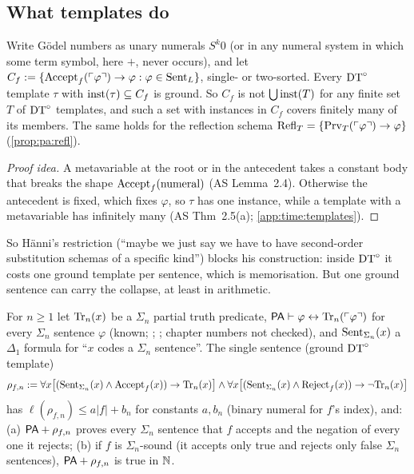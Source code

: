 \subsection{What templates do}\label{sec:time:templates}

\begin{proposition}\label{prop:time:notemplate}
Write Gödel numbers as unary numerals $S^k0$ (or in any numeral system in which some term symbol, here $+$, never occurs), and let $C_f:=\{\mathrm{Accept}_{f}(\ulcorner \varphi\urcorner)\to\varphi:\varphi\in\mathrm{Sent}_L\}$, single- or two-sorted. Every $\mathrm{DT}^{\circ}$ template $\tau$ with $\mathrm{inst}(\tau)\subseteq C_f$ is ground. So $C_f$ is not $\bigcup\mathrm{inst}(T)$ for any finite set $T$ of $\mathrm{DT}^{\circ}$ templates, and such a set with instances in $C_f$ covers finitely many of its members. The same holds for the reflection schema $\mathrm{Refl}_T=\{\mathrm{Prv}_T(\ulcorner \varphi\urcorner)\to\varphi\}$ (\cref{prop:pa:refl}).
\end{proposition}

\begin{proof}[Proof idea]
A metavariable at the root or in the antecedent takes a constant body that breaks the shape $\mathrm{Accept}_{f}(\text{numeral})$ (AS Lemma~2.4). Otherwise the antecedent is fixed, which fixes $\varphi$, so $\tau$ has one instance, while a template with a metavariable has infinitely many (AS Thm~2.5(a); \cref{app:time:templates}).
\end{proof}

So H\"anni's restriction (``maybe we just say we have to have second-order substitution schemas of a specific kind'') blocks his construction: inside $\mathrm{DT}^{\circ}$ it costs one ground template per sentence, which is memorisation. But one ground sentence can carry the collapse, at least in arithmetic.

\begin{proposition}\label{prop:time:collapse}
For $n\ge1$ let $\mathrm{Tr}_n(x)$ be a $\Sigma_n$ partial truth predicate, $\mathsf{PA}\vdash\varphi\leftrightarrow\mathrm{Tr}_n(\ulcorner \varphi\urcorner)$ for every $\Sigma_n$ sentence $\varphi$ (known; \citealp[Ch.~I]{hajek1993metamathematics}; \citealp[Ch.~9]{kaye1991models}; chapter numbers not checked), and $\mathrm{Sent}_{\Sigma_n}(x)$ a $\Delta_1$ formula for ``$x$ codes a $\Sigma_n$ sentence''. The single sentence (ground $\mathrm{DT}^{\circ}$ template)
\[
\rho_{f,n}:=\forall x\big[(\mathrm{Sent}_{\Sigma_n}(x)\wedge\mathrm{Accept}_{f}(x))\to\mathrm{Tr}_n(x)\big]\wedge\forall x\big[(\mathrm{Sent}_{\Sigma_n}(x)\wedge\mathrm{Reject}_{f}(x))\to\neg\mathrm{Tr}_n(x)\big]
\]
has $\ell(\rho_{f,n})\le a|f|+b_n$ for constants $a,b_n$ (binary numeral for $f$'s index), and:
(a) $\mathsf{PA}+\rho_{f,n}$ proves every $\Sigma_n$ sentence that $f$ accepts and the negation of every one it rejects;
(b) if $f$ is $\Sigma_n$-sound (it accepts only true and rejects only false $\Sigma_n$ sentences), $\mathsf{PA}+\rho_{f,n}$ is true in $\mathbb{N}$.
\end{proposition}


